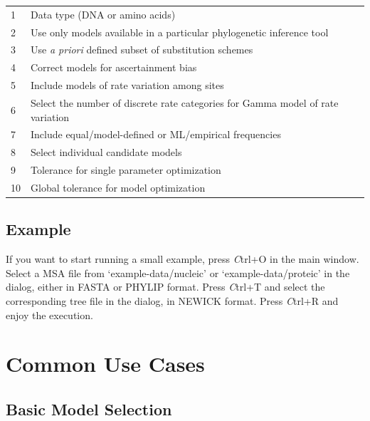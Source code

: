 \documentclass[10pt,twoside,a4paper]{article}
\begin{document}
\begin{tabular}{l p{}}
  \color{Blue}1  & Data type (DNA or amino acids) \\
  \color{Blue}2  & Use only models available in a particular phylogenetic inference tool \\
  \color{Blue}3  & Use \emph{a priori} defined subset of substitution schemes \\
  \color{Blue}4  & Correct models for ascertainment bias \\
  \color{Blue}5  & Include models of rate variation among sites \\
  \color{Blue}6  & Select the number of discrete rate categories for Gamma model of rate variation \\
  \color{Blue}7  & Include equal/model-defined or ML/empirical frequencies \\
  \color{Blue}8  & Select individual candidate models \\
  \hline
  \color{Blue}9  & Tolerance for single parameter optimization \\
  \color{Blue}10 & Global tolerance for model optimization \\
\end{tabular}

\subsection{Example}

If you want to start running a small example, press {\emph Ctrl+O} in the main window.
Select a MSA file from `example-data/nucleic' or `example-data/proteic' in the dialog, either in FASTA or PHYLIP format.
Press {\emph Ctrl+T} and select the corresponding tree file in the dialog, in NEWICK format.
Press {\emph Ctrl+R} and enjoy the execution.





\section{Common Use Cases}

\subsection{Basic Model Selection}
\end{document}

